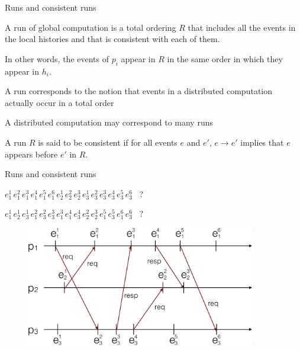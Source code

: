 \begin{frame}{Runs and consistent runs}
	
\begin{definition}[Run]
A \alert{run} of global computation is a total ordering $R$ that includes all the events
in the local histories and that is consistent with each of them.

\medskip
\BI
\item In other words, the events of $p_i$ appear in $R$ in the same order in which they appear in
$h_i$.
\item A run corresponds to the notion that events in a distributed computation
  actually occur in a total order
\item A distributed computation may correspond to many runs
\EI
\end{definition}

\begin{definition}
A run $R$ is said to be \alert{consistent} if for all events $e$ and $e'$,
$e \rightarrow e'$ implies that $e$ appears before $e'$ in $R$.
\end{definition}
\end{frame}


\begin{frame}{Runs and consistent runs}

\BI
\item $e^1_1\,e^2_1\,e^3_1\,e^4_1\,e^5_1\,e^6_1\,e^1_2\,e^2_2\,e^3_2\,e^1_3\,e^2_3\,e^3_3\,e^4_3\,e^5_3\,e^6_3$ \ ?
\item $e^1_1\,e^1_2\,e^1_3\,e^2_1\,e^2_3\,e^3_3\,e^3_1\,e^4_1\,e^4_3\,e^2_2\,e^3_2\,e^5_1\,e^5_3\,e^6_1\,e^6_3$ \ ?
\EI

\begin{figure}
\includegraphics[width=10cm]{figs/03/diagram3}
\end{figure}

\end{frame}

